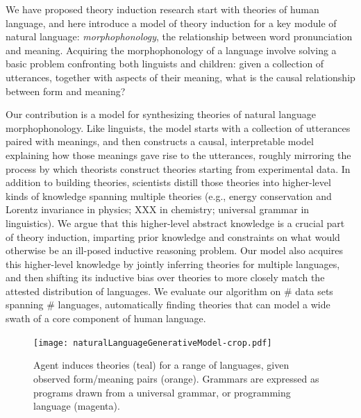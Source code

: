 \documentclass[12pt]{article}
\begin{document}
We have proposed theory induction research start with theories of human
language, and here introduce a model of theory induction for a
key module of natural language: \emph{morphophonology}, the
relationship between word pronunciation and meaning.
Acquiring the morphophonology of a language involve solving a basic
problem confronting both linguists and children: given a collection
of utterances, together with aspects of their meaning, what is the
causal relationship between form and meaning?

Our contribution is a model for synthesizing theories of natural
language morphophonology.  Like linguists, the model starts with a
collection of utterances paired with meanings, and then constructs a
causal, interpretable model explaining how those meanings gave rise to
the utterances, roughly mirroring the process by which theorists
construct theories starting from experimental data.  In addition to
building theories, scientists distill those theories into higher-level
kinds of knowledge spanning multiple theories (e.g., energy
conservation and Lorentz invariance in physics; XXX in chemistry;
universal grammar in linguistics).  We argue that this higher-level
abstract knowledge is a crucial part of theory induction, imparting
prior knowledge and constraints on what would otherwise be an
ill-posed inductive reasoning problem.  Our model also acquires this
higher-level knowledge by jointly inferring theories for multiple
languages, and then shifting its inductive bias over theories to more
closely match the attested distribution of languages.  We evaluate our
algorithm on \# data sets spanning \# languages, automatically finding
theories that can model a wide swath of a core component of human
language.






\begin{figure}
  \texttt{[image: naturalLanguageGenerativeModel-crop.pdf]}
  \caption{Agent induces theories (teal) for a range of languages, given observed form/meaning pairs (orange). Grammars are expressed as programs drawn from a universal grammar, or programming language (magenta). }\label{generativeModel}
  \end{figure}
\end{document}
